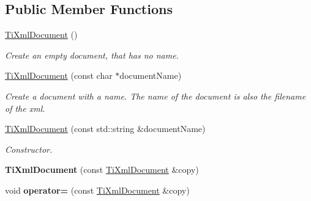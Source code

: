 \subsection*{Public Member Functions}
\begin{DoxyCompactItemize}
\item 
\hypertarget{class_ti_xml_document_a9f5e84335708fde98400230f9f12659c}{
\hyperlink{class_ti_xml_document_a9f5e84335708fde98400230f9f12659c}{TiXmlDocument} ()}
\label{class_ti_xml_document_a9f5e84335708fde98400230f9f12659c}

\begin{DoxyCompactList}\small\item\em Create an empty document, that has no name. \item\end{DoxyCompactList}\item 
\hypertarget{class_ti_xml_document_ae4508b452d0c3061db085f3db27b8396}{
\hyperlink{class_ti_xml_document_ae4508b452d0c3061db085f3db27b8396}{TiXmlDocument} (const char $\ast$documentName)}
\label{class_ti_xml_document_ae4508b452d0c3061db085f3db27b8396}

\begin{DoxyCompactList}\small\item\em Create a document with a name. The name of the document is also the filename of the xml. \item\end{DoxyCompactList}\item 
\hypertarget{class_ti_xml_document_a2c6e58fb99bfa76cc613f16840022225}{
\hyperlink{class_ti_xml_document_a2c6e58fb99bfa76cc613f16840022225}{TiXmlDocument} (const std::string \&documentName)}
\label{class_ti_xml_document_a2c6e58fb99bfa76cc613f16840022225}

\begin{DoxyCompactList}\small\item\em Constructor. \item\end{DoxyCompactList}\item 
\hypertarget{class_ti_xml_document_a323a7486e7da6099cdc19a5ff7e74b07}{
{\bfseries TiXmlDocument} (const \hyperlink{class_ti_xml_document}{TiXmlDocument} \&copy)}
\label{class_ti_xml_document_a323a7486e7da6099cdc19a5ff7e74b07}

\item 
\hypertarget{class_ti_xml_document_aafbfacc3414008f619b1345775ef12a4}{
void {\bfseries operator=} (const \hyperlink{class_ti_xml_document}{TiXmlDocument} \&copy)}
\label{class_ti_xml_document_aafbfacc3414008f619b1345775ef12a4}


\end{DoxyCompactItemize}
